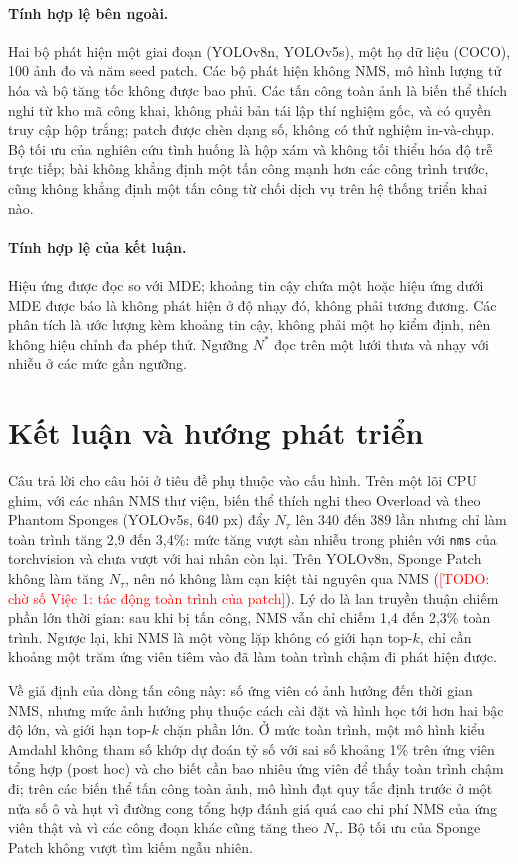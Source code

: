 \documentclass[12pt,a4paper]{article}
\newcommand{\todo}[1]{\textcolor{red}{[TODO: #1]}}
\newcommand{\Ntau}{N_{\tau}}
\begin{document}
\paragraph{Tính hợp lệ bên ngoài.}
Hai bộ phát hiện một giai đoạn (YOLOv8n, YOLOv5s), một họ dữ liệu (COCO), 100 ảnh đo và năm seed patch. Các bộ phát hiện không NMS, mô hình lượng tử hóa và bộ tăng tốc không được bao phủ. Các tấn công toàn ảnh là biến thể thích nghi từ kho mã công khai, không phải bản tái lập thí nghiệm gốc, và có quyền truy cập hộp trắng; patch được chèn dạng số, không có thử nghiệm in-và-chụp. Bộ tối ưu của nghiên cứu tình huống là hộp xám và không tối thiểu hóa độ trễ trực tiếp; bài không khẳng định một tấn công mạnh hơn các công trình trước, cũng không khẳng định một tấn công từ chối dịch vụ trên hệ thống triển khai nào.
\paragraph{Tính hợp lệ của kết luận.}
Hiệu ứng được đọc so với MDE; khoảng tin cậy chứa một hoặc hiệu ứng dưới MDE được báo là không phát hiện ở độ nhạy đó, không phải tương đương. Các phân tích là ước lượng kèm khoảng tin cậy, không phải một họ kiểm định, nên không hiệu chỉnh đa phép thử. Ngưỡng $N^{*}$ đọc trên một lưới thưa và nhạy với nhiễu ở các mức gần ngưỡng.

\section{Kết luận và hướng phát triển}
\label{sec:conclusion}
Câu trả lời cho câu hỏi ở tiêu đề phụ thuộc vào cấu hình. Trên một lõi CPU ghim, với các nhân NMS thư viện, biến thể thích nghi theo Overload và theo Phantom Sponges (YOLOv5s, 640 px) đẩy $\Ntau$ lên 340 đến 389 lần nhưng chỉ làm toàn trình tăng 2,9 đến 3,4\%: mức tăng vượt sàn nhiễu trong phiên với \texttt{nms} của torchvision và chưa vượt với hai nhân còn lại. Trên YOLOv8n, Sponge Patch không làm tăng $\Ntau$, nên nó không làm cạn kiệt tài nguyên qua NMS (\todo{chờ số Việc 1: tác động toàn trình của patch}). Lý do là lan truyền thuận chiếm phần lớn thời gian: sau khi bị tấn công, NMS vẫn chỉ chiếm 1,4 đến 2,3\% toàn trình. Ngược lại, khi NMS là một vòng lặp không có giới hạn top-$k$, chỉ cần khoảng một trăm ứng viên tiêm vào đã làm toàn trình chậm đi phát hiện được.

Về giả định của dòng tấn công này: số ứng viên có ảnh hưởng đến thời gian NMS, nhưng mức ảnh hưởng phụ thuộc cách cài đặt và hình học tới hơn hai bậc độ lớn, và giới hạn top-$k$ chặn phần lớn. Ở mức toàn trình, một mô hình kiểu Amdahl không tham số khớp dự đoán tỷ số với sai số khoảng 1\% trên ứng viên tổng hợp (post hoc) và cho biết cần bao nhiêu ứng viên để thấy toàn trình chậm đi; trên các biến thể tấn công toàn ảnh, mô hình đạt quy tắc định trước ở một nửa số ô và hụt vì đường cong tổng hợp đánh giá quá cao chi phí NMS của ứng viên thật và vì các công đoạn khác cũng tăng theo $\Ntau$. Bộ tối ưu của Sponge Patch không vượt tìm kiếm ngẫu nhiên.
\end{document}
